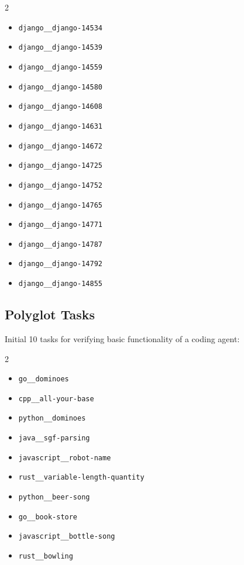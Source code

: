 \documentclass{article}
\begin{document}
\begin{multicols}{2}
\begin{itemize}
    \item \texttt{django\_\_django-14534}
    \item \texttt{django\_\_django-14539}
    \item \texttt{django\_\_django-14559}
    \item \texttt{django\_\_django-14580}
    \item \texttt{django\_\_django-14608}
    \item \texttt{django\_\_django-14631}
    \item \texttt{django\_\_django-14672}
    \item \texttt{django\_\_django-14725}
    \item \texttt{django\_\_django-14752}
    \item \texttt{django\_\_django-14765}
    \item \texttt{django\_\_django-14771}
    \item \texttt{django\_\_django-14787}
    \item \texttt{django\_\_django-14792}
    \item \texttt{django\_\_django-14855}
\end{itemize}
\end{multicols}


\subsection{Polyglot Tasks}
\label{app:polyglot-tasks}

Initial 10 tasks for verifying basic functionality of a coding agent:

\begin{multicols}{2}
\begin{itemize}
    \item \texttt{go\_\_dominoes}
    \item \texttt{cpp\_\_all-your-base}
    \item \texttt{python\_\_dominoes}
    \item \texttt{java\_\_sgf-parsing}
    \item \texttt{javascript\_\_robot-name}
    \item \texttt{rust\_\_variable-length-quantity}
    \item \texttt{python\_\_beer-song}
    \item \texttt{go\_\_book-store}
    \item \texttt{javascript\_\_bottle-song}
    \item \texttt{rust\_\_bowling}
\end{itemize}
\end{multicols}
\end{document}
